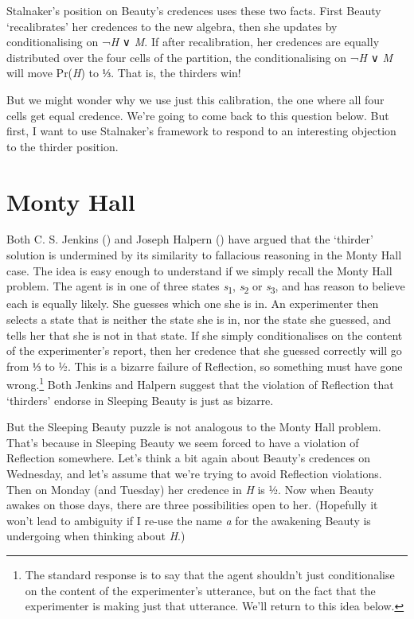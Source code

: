 \documentclass[
  11pt,
  letterpaper,
  DIV=11,
  numbers=noendperiod,
  twoside]{scrartcl}
\begin{document}
Stalnaker's position on Beauty's credences uses these two facts. First
Beauty `recalibrates' her credences to the new algebra, then she updates
by conditionalising on ¬\emph{H} ∨ \emph{M}. If after recalibration, her
credences are equally distributed over the four cells of the partition,
the conditionalising on ¬\emph{H} ∨ \emph{M} will move Pr(\emph{H}) to
⅓. That is, the thirders win!

But we might wonder why we use just this calibration, the one where all
four cells get equal credence. We're going to come back to this question
below. But first, I want to use Stalnaker's framework to respond to an
interesting objection to the thirder position.

\section{Monty Hall}\label{monty-hall}

Both C. S. Jenkins () and Joseph Halpern
() have argued that the `thirder'
solution is undermined by its similarity to fallacious reasoning in the
Monty Hall case. The idea is easy enough to understand if we simply
recall the Monty Hall problem. The agent is in one of three states
\emph{s}\textsubscript{1}, \emph{s}\textsubscript{2} or
\emph{s}\textsubscript{3}, and has reason to believe each is equally
likely. She guesses which one she is in. An experimenter then selects a
state that is neither the state she is in, nor the state she guessed,
and tells her that she is not in that state. If she simply
conditionalises on the content of the experimenter's report, then her
credence that she guessed correctly will go from ⅓ to ½. This is a
bizarre failure of Reflection, so something must have gone
wrong.\footnote{The standard response is to say that the agent shouldn't
  just conditionalise on the content of the experimenter's utterance,
  but on the fact that the experimenter is making just that utterance.
  We'll return to this idea below.} Both Jenkins and Halpern suggest
that the violation of Reflection that `thirders' endorse in Sleeping
Beauty is just as bizarre.

But the Sleeping Beauty puzzle is not analogous to the Monty Hall
problem. That's because in Sleeping Beauty we seem forced to have a
violation of Reflection somewhere. Let's think a bit again about
Beauty's credences on Wednesday, and let's assume that we're trying to
avoid Reflection violations. Then on Monday (and Tuesday) her credence
in \emph{H} is ½. Now when Beauty awakes on those days, there are three
possibilities open to her. (Hopefully it won't lead to ambiguity if I
re-use the name \emph{a} for the awakening Beauty is undergoing when
thinking about \emph{H}.)
\end{document}
